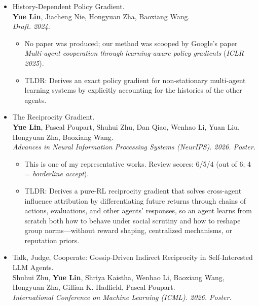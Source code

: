 \documentclass[a4paper,20pt]{article}
\begin{document}
\begin{itemize}[leftmargin=*,itemsep=0pt,topsep=0pt,partopsep=0pt]
\begin{itemize}[itemsep=0pt,topsep=0pt,partopsep=0pt]
        \item TLDR: Represents each agent's strategy as readable source code and introduces Programmatic Iterated Best Response, where an LLM rewrites one policy against another using game rewards and unit tests as feedback.
      \end{itemize}
\item History-Dependent Policy Gradient. \\
      \textbf{Yue Lin}, Jiacheng Nie, Hongyuan Zha, Baoxiang Wang. \\
      \textit{Draft. 2024.}
      \begin{itemize}[itemsep=0pt,topsep=0pt,partopsep=0pt]
        \item No paper was produced; our method was scooped by Google's paper
              \textit{Multi-agent cooperation through learning-aware policy gradients}
              (\textit{ICLR 2025}).
        \item TLDR: Derives an exact policy gradient for non-stationary multi-agent learning systems by explicitly accounting for the histories of the other agents.
      \end{itemize}
\item The Reciprocity Gradient. \\
      \textbf{Yue Lin}, Pascal Poupart, Shuhui Zhu, Dan Qiao, Wenhao Li, Yuan Liu, Hongyuan Zha, Baoxiang Wang. \\
      \textit{Advances in Neural Information Processing Systems (NeurIPS). 2026. Poster.}
      \begin{itemize}[itemsep=0pt,topsep=0pt,partopsep=0pt]
        \item This is one of my representative works. Review scores: 6/5/4 (out of 6; 4 = \textit{borderline accept}).

        \item TLDR: Derives a pure-RL reciprocity gradient that solves cross-agent influence attribution by differentiating future returns through chains of actions, evaluations, and other agents' responses, so an agent learns from scratch both how to behave under social scrutiny and how to reshape group norms---without reward shaping, centralized mechanisms, or reputation priors.
      \end{itemize}
\item Talk, Judge, Cooperate: Gossip-Driven Indirect Reciprocity in Self-Interested LLM Agents. \\
      Shuhui Zhu, \textbf{Yue Lin}, Shriya Kaistha, Wenhao Li, Baoxiang Wang, Hongyuan Zha, Gillian K. Hadfield, Pascal Poupart. \\
      \textit{International Conference on Machine Learning (ICML). 2026. Poster.}
      \begin{itemize}[itemsep=0pt,topsep=0pt,partopsep=0pt]


\end{itemize}
\end{itemize}
\end{document}
